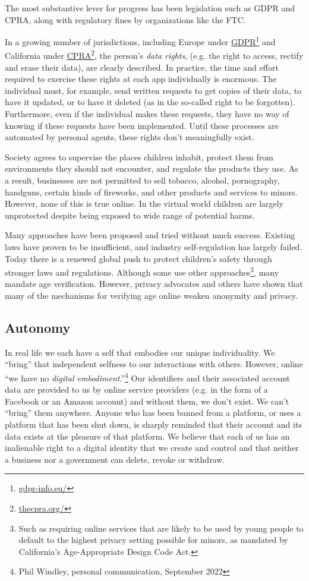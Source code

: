 \documentclass[11pt, oneside]{article}   	%
\newcommand{\hyperfootnote}[1][]{\def\ArgI{{#1}}\hyperfootnoteRelay}
\newcommand\hyperfootnoteRelay[2][]{\href{#1#2}{\ArgI}\footnote{\href{#1#2}{#2}}}
\begin{document}
The most substantive lever for progress has been legislation such as GDPR and CPRA, along with regulatory fines by organizations like the FTC. 

In a growing number of jurisdictions, including Europe under \hyperfootnote[GDPR][https://]{gdpr-info.eu/} and California under \hyperfootnote[CPRA][https://]{thecpra.org/}, the person's \emph{data rights}, (e.g. the right to access, rectify and erase their data), are clearly described. In practice, the time and effort required to exercise these rights at each app individually is enormous. The individual must, for example, send written requests to get copies of their data, to have it updated, or to have it deleted (as in the so-called right to be forgotten). Furthermore, even if the individual makes these requests, they have no way of knowing if these requests have been implemented. Until these processes are automated by personal agents, these rights don't meaningfully exist.

Society agrees to supervise the places children inhabit, protect them from environments they should not encounter, and regulate the products they use. As a result, businesses are not permitted to sell tobacco, alcohol, pornography, handguns, certain kinds of fireworks, and other products and services to minors. However, none of this is true online. In the virtual world children are largely unprotected despite being exposed to wide range of potential harms. 

Many approaches have been proposed and tried without much success. Existing laws have proven to be insufficient, and industry self-regulation has largely failed. Today there is a renewed global push to protect children's safety through stronger laws and regulations. Although some use other approaches\footnote{Such as requiring online services that are likely to be used by young people to default to the highest privacy setting possible for minors, as mandated by California's Age-Appropriate Design Code Act.}, many mandate age verification.\cite{Griswold2023}\cite{Jackson2023} However, privacy advocates and others have shown that many of the mechanisms for verifying age online weaken anonymity and privacy.\cite{Roth2023}

\subsection{Autonomy}

In real life we each have a self that embodies our unique individuality. We ``bring'' that independent selfness to our interactions with others. However, online ``we have no \emph{digital embodiment}.''\footnote{Phil Windley, personal communication, September 2022} Our identifiers and their associated account data are provided to us by online service providers (e.g. in the form of a Facebook or an Amazon account) and without them, we don't exist. We can't ``bring'' them anywhere. Anyone who has been banned from a platform, or uses a platform that has been shut down, is sharply reminded that their account and its data exists at the pleasure of that platform. We believe that each of us has an inalienable right to a digital identity that we create and control and that neither a business nor a government can delete, revoke or withdraw.
\end{document}
